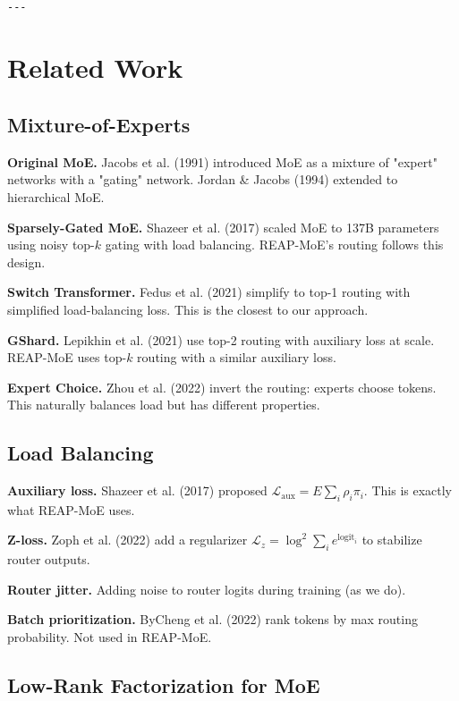 \begin{lstlisting}

---
\end{lstlisting}

\section{Related Work}

\subsection{Mixture-of-Experts}

\textbf{Original MoE.} Jacobs et al. (1991) introduced MoE as a mixture of 
"expert" networks with a "gating" network. Jordan \& Jacobs (1994) extended 
to hierarchical MoE.

\textbf{Sparsely-Gated MoE.} Shazeer et al. (2017) scaled MoE to 137B parameters 
using noisy top-$k$ gating with load balancing. REAP-MoE's routing follows 
this design.

\textbf{Switch Transformer.} Fedus et al. (2021) simplify to top-1 routing with 
simplified load-balancing loss. This is the closest to our approach.

\textbf{GShard.} Lepikhin et al. (2021) use top-2 routing with auxiliary loss 
at scale. REAP-MoE uses top-$k$ routing with a similar auxiliary loss.

\textbf{Expert Choice.} Zhou et al. (2022) invert the routing: experts choose 
tokens. This naturally balances load but has different properties.

\subsection{Load Balancing}

\textbf{Auxiliary loss.} Shazeer et al. (2017) proposed 
$\mathcal{L}_\text{aux} = E \sum_i \rho_i \pi_i$. This is exactly what REAP-MoE 
uses.

\textbf{Z-loss.} Zoph et al. (2022) add a regularizer $\mathcal{L}_z = \log^2 \sum_i e^{\text{logit}_i}$ 
to stabilize router outputs.

\textbf{Router jitter.} Adding noise to router logits during training (as we do).

\textbf{Batch prioritization.} ByCheng et al. (2022) rank tokens by max routing 
probability. Not used in REAP-MoE.

\subsection{Low-Rank Factorization for MoE}

